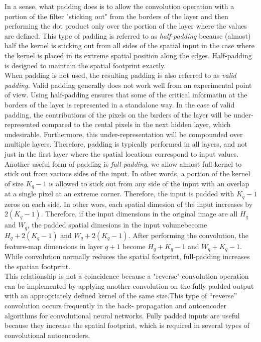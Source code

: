 \documentclass[11pt]{article}
\begin{document}
In a sense, what padding does is to allow the convolution operation with a portion of the filter "sticking out" from the borders of the layer and then performing the dot product only over the portion of the layer where the values are defined. This type of padding is referred to as \textit{half-padding} because (almost) half the kernel is sticking out from all sides of the spatial input in the case where the kernel is placed in its extreme spatial position along the edges. Half-padding is designed to maintain the spatial footprint exactly.\\
\hspace*{1cm} When padding is not used, the resulting padding is also referred to as \textit{valid padding.} Valid padding generally does not work well from an experimental point of view. Using half-padding ensures that some of the critical informatiın at the borders of the layer is represented in a standalone way. In the case of valid padding, the contributions of the pixels on the bırders of the layer will be under-represented compared to the cental pixels in the next hidden layer, which undesirable. Furthermore, this under-representation will be compounded over multiple layers. Therefore, padding is typically performed in all layers, and not just in the first layer where the spatial locations correspond to input values. \\
\hspace*{1cm} Another useful form of padding is \textit{full-padding}, we allow almost full kernel to stick out from various sides of the input. In other words, a portion of the kernel of size $K_q-1$ is allowed to stick out from any side of the input with an overlap at a single pixel at an extreme corner. Therefore, the input is padded with $K_q-1$ zeros on each side. In other wors, each spatial dimesion of the input increases by $2(K_q-1)$. Therefore, if the input dimensions in the original image are all $H_q$ and $W_q$, the padded spatial dimesions in the input volumebecome $H_q+2(K_q-1)$ and $W_q+2(K_q-1)$. After performing the convolution, the feature-map dimensions in layer $q+1$ become $H_q+K_q-1$ and $W_q+K_q-1$. While convolution normally reduces the spatial footprint, full-padding increases the spatian footprint.\\
This relationship is not a coincidence because a "reverse" convolution operation can be implemented by applying another convolution on the fully padded output with an appropriately defined kernel of the same size.This type of “reverse” convolution occurs frequently in the back- propagation and autoencoder algorithms for convolutional neural networks. Fully padded inputs are useful because they increase the spatial footprint, which is required in several types of convolutional autoencoders.
\end{document}
